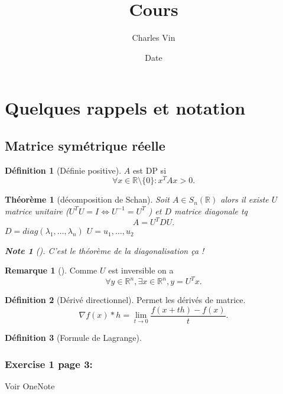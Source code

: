 \documentclass{article}
\title{Cours}
\author{Charles Vin}
\date{Date}
\theoremstyle{plain}%
\newtheorem{thm}{Théorème}[section]
\theoremstyle{definition}
\newtheorem{defn}{Définition}[section]
\newtheorem*{rem}{Remarque}
\newtheorem*{note}{Note}
\begin{document}
\maketitle


\section{Quelques rappels et notation}
\subsection{Matrice symétrique réelle}
\begin{defn}[Définie positive]
    $ A $ est DP si 
    \[
        \forall x \in \mathbb{R}\setminus \{0\} : x^T A x > 0
    .\]
\end{defn}

\begin{thm}[décomposition de Schan]
    Soit $ A \in S_n(\mathbb{R}) $ alors il existe $ U $ matrice unitaire ($ U^TU=I \Leftrightarrow U^{-1}=U^T $ ) et $ D $ matrice diagonale tq 
    \[
        A=U^TDU
    .\]
    $ D=diag(\lambda _1, \dots, \lambda _n) $ 
    $ U={u_1,\dots,u_2} $ 
    \begin{note}[]
        C'est le théorème de la diagonalisation ça !
    \end{note}
\end{thm}
\begin{rem}[]
    Comme $ U $ est inversible on a 
    \[
        \forall y \in \mathbb{R}^n, \exists x \in \mathbb{R}^n, y=U^Tx
    .\]
\end{rem}

\begin{defn}[Dérivé directionnel]
    Permet les dérivés de matrice.
    \[
        \nabla f(x) * h = \lim_{t \to 0} \frac{f(x+th) - f(x)}{t}
    .\]
\end{defn}

\begin{defn}[Formule de Lagrange]
    
\end{defn}

\subsubsection{Exercise 1 page 3:}
Voir OneNote
\end{document}
